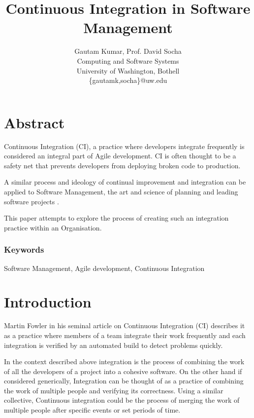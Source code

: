 \documentclass[12pt,conference]{IEEEtran}
\begin{document}
\title{Continuous Integration in Software Management}


\author{
{\rm Gautam Kumar, Prof. David Socha}\\
Computing and Software Systems\\
University of Washington, Bothell\\
\{gautamk,socha\}@uw.edu
} %

\maketitle
\thispagestyle{empty}


\section*{Abstract}
Continuous Integration (CI), a practice where developers integrate 
frequently \cite{stahl_modeling_2014} is considered an integral part of Agile 
development. CI is often thought to be a safety net that prevents developers from deploying broken code to production. 

A similar process and ideology of continual improvement and integration can be applied to Software Management, the art and science of planning and leading software projects \cite{stellman_applied_2005}.

This paper attempts to explore the process of creating such an integration practice within an Organisation.

\subsubsection*{Keywords}

Software Management, Agile development, Continuous Integration

\section*{Introduction}

Martin Fowler in his seminal article \cite{fowler_continuous_2006} on Continuous Integration (CI) describes it as a practice where members of a team integrate their work frequently and each integration is verified by an automated build to detect problems quickly.

In the context described above integration is the process of combining the work of all the developers of a project into a cohesive software. On the other hand if considered generically, Integration can be thought of as a practice of combining the work of multiple people and verifying its correctness. Using a similar collective, Continuous integration could be the process of merging the work of multiple people after specific events or set periods of time.
\end{document}
